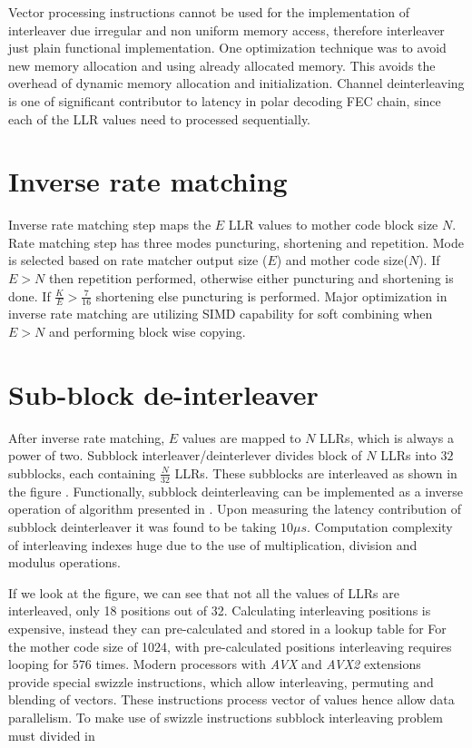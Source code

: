 Vector processing instructions cannot be used for the implementation of interleaver due irregular and non uniform memory access, therefore interleaver just plain functional implementation. One optimization technique was to avoid new memory allocation and using already allocated memory. This avoids the overhead of dynamic memory allocation and initialization. Channel deinterleaving is one of significant contributor to latency in polar decoding FEC chain, since each of the LLR values need to processed sequentially.

\section{Inverse rate matching}
Inverse rate matching step maps the $E$ LLR values to mother code block size $ N $. Rate matching step has three modes puncturing, shortening and repetition. Mode is selected based on rate matcher output size ($E$) and mother code size($ N $). If $E > N$ then repetition performed, otherwise either puncturing and shortening is done. If $ \frac{K}{E} > \frac{7}{16} $ shortening else puncturing is performed. Major optimization in inverse rate matching are utilizing SIMD capability for soft combining when $ E>N $ and performing block wise copying. 
%
%
\section{Sub-block de-interleaver}
After inverse rate matching, $E$ values are mapped to $N$ LLRs, which is always a power of two. Subblock interleaver/deinterlever divides block of $N$ LLRs into $32$ subblocks, each containing $\frac{N}{32}$ LLRs. These subblocks are interleaved as shown in the figure . Functionally, subblock deinterleaving can be implemented as a inverse operation of algorithm presented in \cite{3gpp.38.212}. Upon measuring the latency contribution of subblock deinterleaver it was found to be taking $10 \mu s$. Computation complexity of interleaving indexes huge due to the use of multiplication, division and modulus operations.

If we look at the figure, we can see that not all the values of LLRs are interleaved, only 18 positions out of 32. Calculating interleaving positions is expensive, instead they can pre-calculated and stored in a lookup table for For the mother code size of 1024, with pre-calculated positions interleaving requires looping for $ 576 $ times. Modern processors with \textit{AVX} and \textit{AVX2} extensions provide special swizzle instructions, which allow interleaving, permuting and blending of vectors. These instructions process vector of values hence allow data parallelism. To make use of swizzle instructions subblock interleaving problem must divided in 


